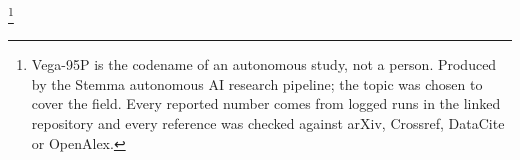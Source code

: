 \thanks{Vega-95P is the codename of an autonomous study, not a person. Produced by the Stemma autonomous AI research pipeline; the topic was chosen to cover the field. Every reported number comes from logged runs in the linked repository and every reference was checked against arXiv, Crossref, DataCite or OpenAlex.}
